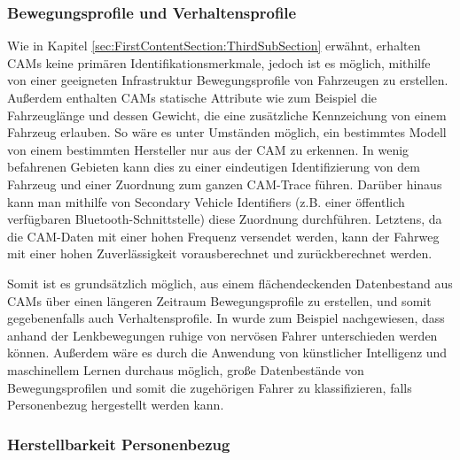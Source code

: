 \subsubsection{Bewegungsprofile und Verhaltensprofile}
\label{sec:SecondContentSection:SecondSubsection:FirstSubSubsection}

Wie in Kapitel \ref{sec:FirstContentSection:ThirdSubSection} erwähnt, erhalten CAMs keine primären Identifikationsmerkmale, jedoch ist es möglich, mithilfe von einer geeigneten Infrastruktur Bewegungsprofile von Fahrzeugen zu erstellen. Außerdem enthalten CAMs statische Attribute wie zum Beispiel die Fahrzeuglänge und dessen Gewicht, die eine zusätzliche Kennzeichung von einem Fahrzeug erlauben. So wäre es unter Umständen möglich, ein bestimmtes Modell von einem bestimmten Hersteller nur aus der CAM zu erkennen. In wenig befahrenen Gebieten kann dies zu einer eindeutigen Identifizierung von dem Fahrzeug und einer Zuordnung zum ganzen CAM-Trace führen. Darüber hinaus kann man mithilfe von Secondary Vehicle Identifiers (z.B. einer öffentlich verfügbaren Bluetooth-Schnittstelle) diese Zuordnung durchführen. Letztens, da die CAM-Daten mit einer hohen Frequenz versendet werden, kann der Fahrweg mit einer hohen Zuverlässigkeit vorausberechnet und zurückberechnet werden. 

Somit ist es grundsätzlich möglich, aus einem flächendeckenden Datenbestand aus CAMs über einen längeren Zeitraum Bewegungsprofile zu erstellen, und somit gegebenenfalls auch Verhaltensprofile. In \cite{Dettki2005} wurde zum Beispiel nachgewiesen, dass anhand der Lenkbewegungen ruhige von nervösen Fahrer unterschieden werden können. Außerdem wäre es durch die Anwendung von künstlicher Intelligenz und maschinellem Lernen durchaus möglich, große Datenbestände von Bewegungsprofilen und somit die zugehörigen Fahrer zu klassifizieren, falls Personenbezug hergestellt werden kann. 

\subsubsection{Herstellbarkeit Personenbezug}
\label{sec:SecondContentSection:SecondSubsection:SecondSubSubsection}

